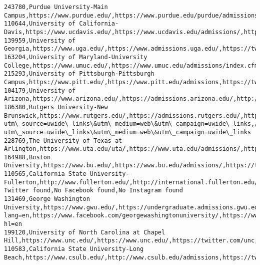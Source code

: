 \documentclass[11pt]{article}
\begin{document}
\begin{Verbatim}[commandchars=\\\{\}]
243780,Purdue University-Main Campus,https://www.purdue.edu/,https://www.purdue.edu/purdue/admissions/index.php,https://twitter.com/lifeatpurdue,https://www.facebook.com/PurdueUniversity/,https://www.instagram.com/lifeatpurdue/
110644,University of California-Davis,https://www.ucdavis.edu/,https://www.ucdavis.edu/admissions/,https://twitter.com/ucdavis,https://www.facebook.com/UCDavis,https://instagram.com/ucdavis
139959,University of Georgia,https://www.uga.edu/,https://www.admissions.uga.edu/,https://twitter.com/universityofga,https://www.facebook.com/universityofga/,https://www.instagram.com/universityofga/
163204,University of Maryland-University College,https://www.umuc.edu/,https://www.umuc.edu/admissions/index.cfm,http://twitter.com/umuc,https://www.facebook.com/UMUC,http://instagram.com/umucpix
215293,University of Pittsburgh-Pittsburgh Campus,https://www.pitt.edu/,https://www.pitt.edu/admissions,https://twitter.com/PittTweet,http://www.facebook.com/upitt,http://www.instagram.com/pittadmissions
104179,University of Arizona,https://www.arizona.edu/,https://admissions.arizona.edu/,http://twitter.com/uofa,http://facebook.com/uarizona,http://instagram.com/uarizona
186380,Rutgers University-New Brunswick,https://www.rutgers.edu/,https://admissions.rutgers.edu/,https://twitter.com/RutgersU,//www.facebook.com/RutgersU?utm\_source=uwide\_links\&utm\_medium=web\&utm\_campaign=uwide\_links,//instagram.com/RutgersU?utm\_source=uwide\_links\&utm\_medium=web\&utm\_campaign=uwide\_links
228769,The University of Texas at Arlington,https://www.uta.edu/uta/,https://www.uta.edu/admissions/,https://twitter.com/utarlington,https://www.facebook.com/utarlington/,https://www.instagram.com/utarlington/
164988,Boston University,https://www.bu.edu/,https://www.bu.edu/admissions/,https://twitter.com/BU\_Tweets,http://www.facebook.com/BostonUniversity,https://www.instagram.com/applytobu/
110565,California State University-Fullerton,http://www.fullerton.edu/,http://international.fullerton.edu/admissions/,No Twitter found,No Facebook found,No Instagram found
131469,George Washington University,https://www.gwu.edu/,https://undergraduate.admissions.gwu.edu/,https://twitter.com/GWtweets?lang=en,https://www.facebook.com/georgewashingtonuniversity/,https://www.instagram.com/gwuniversity/?hl=en
199120,University of North Carolina at Chapel Hill,https://www.unc.edu/,https://www.unc.edu/,https://twitter.com/unc,https://www.facebook.com/uncchapelhill/,https://www.instagram.com/uncchapelhill/
110583,California State University-Long Beach,https://www.csulb.edu/,http://www.csulb.edu/admissions,https://twitter.com/csulb,https://www.facebook.com/csulb,http://instagram.com/csulongbeach

\end{Verbatim}
\end{document}
